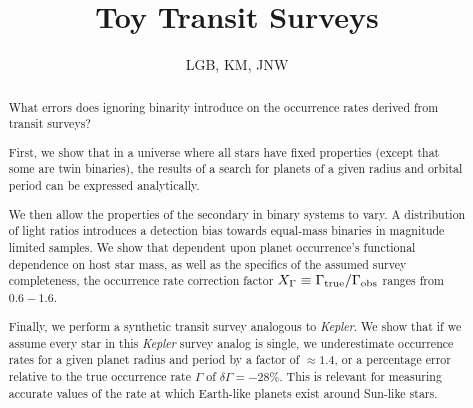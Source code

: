 \documentclass{emulateapj}
\begin{document}
%
\def\ltsima{$\; \buildrel < \over \sim \;$}
\def\lsim{\lower.5ex\hbox{\ltsima}}
\def\gtsima{$\; \buildrel > \over \sim \;$}
\def\gsim{\lower.5ex\hbox{\gtsima}}
\def\tess{{\it TESS} }
\def \teff {T_{\rm eff}}
\def \phir {\Phi_{\rm R}}
\def \fov {24$^{\circ}$}
\def \pixsz {21.1''}
\def \aeff {69.1 cm$^2$ }    
\def \epd {105 mm}                          

\def \kepler {{\it Kepler}}

%



\title{ Toy Transit Surveys }

\author{
  LGB, KM, JNW
}



\begin{abstract}

What errors does ignoring binarity introduce on the occurrence rates derived 
from transit surveys?

First, we show that in a universe where all stars have fixed properties
(except that some are twin binaries), the results of a search for planets of a 
given radius and orbital period can be expressed analytically.

We then allow the properties of the secondary in binary systems to vary. A 
distribution of light ratios introduces a detection bias towards 
equal-mass binaries in magnitude limited samples.
We show that dependent upon planet occurrence's functional dependence on host 
star mass, as well as the specifics of the assumed survey completeness, the 
occurrence rate correction factor $X_\Gamma \equiv \Gamma_{\rm 
true}/\Gamma_{\rm obs}$ ranges from $0.6-1.6$.

Finally, we perform a synthetic transit survey analogous to {\it Kepler}. We 
show that if we assume every star in this {\it Kepler} survey analog is single, 
we underestimate occurrence rates for a given planet radius and period by 
a factor of $\approx 1.4$, or a percentage error relative to the true 
occurrence rate $\Gamma$ of $\delta\Gamma=-28\%$.
This is relevant for measuring accurate values of the rate at which Earth-like 
planets exist around Sun-like stars.


\end{abstract}
\end{document}
